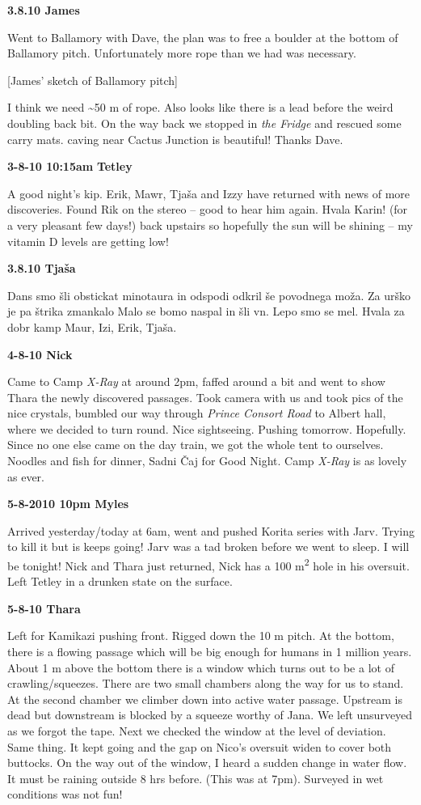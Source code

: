 \textbf{3.8.10 James}

Went to Ballamory with Dave, the plan was to free a boulder at the
bottom of Ballamory pitch. Unfortunately more rope than we had was
necessary.

{[}James' sketch of Ballamory pitch{]}

I think we need \textasciitilde 50 m of rope. Also looks like there is a
lead before the weird doubling back bit. On the way back we stopped in
\emph{the Fridge} and rescued some carry mats. caving near Cactus
Junction is beautiful! Thanks Dave.

\textbf{3-8-10 10:15am} \textbf{Tetley}

A good night's kip. Erik, Mawr, Tjaša and Izzy have returned with news
of more discoveries. Found Rik on the stereo -- good to hear him again.
Hvala Karin! (for a very pleasant few days!) back upstairs so hopefully
the sun will be shining -- my vitamin D levels are getting low!

\textbf{3.8.10 Tjaša}

Dans smo šli obstickat minotaura in odspodi odkril še povodnega moža. Za
urško je pa štrika zmankalo Malo se bomo naspal in šli vn. Lepo smo se
mel. Hvala za dobr kamp Maur, Izi, Erik, Tjaša.

\textbf{4-8-10 Nick}

Came to Camp \emph{X-Ray} at around 2pm, faffed around a bit and went to
show Thara the newly discovered passages. Took camera with us and took
pics of the nice crystals, bumbled our way through \emph{Prince Consort
Road} to Albert hall, where we decided to turn round. Nice sightseeing.
Pushing tomorrow. Hopefully. Since no one else came on the day train, we
got the whole tent to ourselves. Noodles and fish for dinner, Sadni Čaj
for Good Night. Camp \emph{X-Ray} is as lovely as ever.

\textbf{5-8-2010 10pm Myles}

Arrived yesterday/today at 6am, went and pushed Korita series with Jarv.
Trying to kill it but is keeps going! Jarv was a tad broken before we
went to sleep. I will be tonight! Nick and Thara just returned, Nick has
a 100 m\textsuperscript{2} hole in his oversuit. Left Tetley in a
drunken state on the surface.

\textbf{5-8-10 Thara}

Left for Kamikazi pushing front. Rigged down the 10 m pitch. At the
bottom, there is a flowing passage which will be big enough for humans
in 1 million years. About 1 m above the bottom there is a window which
turns out to be a lot of crawling/squeezes. There are two small chambers
along the way for us to stand. At the second chamber we climber down
into active water passage. Upstream is dead but downstream is blocked by
a squeeze worthy of Jana. We left unsurveyed as we forgot the tape. Next
we checked the window at the level of deviation. Same thing. It kept
going and the gap on Nico's oversuit widen to cover both buttocks. On
the way out of the window, I heard a sudden change in water flow. It
must be raining outside 8 hrs before. (This was at 7pm). Surveyed in wet
conditions was not fun!

